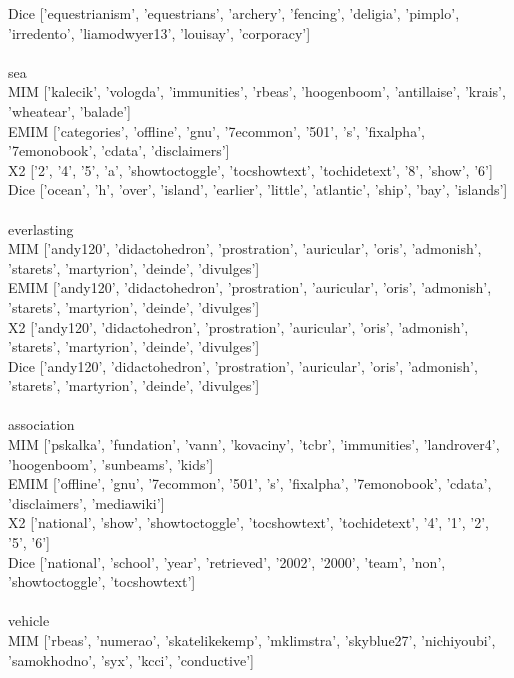 \documentclass[10pt,letterpaper,bibliography=totoc]{scrartcl}
\begin{document}
  Dice ['equestrianism', 'equestrians', 'archery', 'fencing', 'deligia', 'pimplo', 'irredento', 'liamodwyer13', 'louisay', 'corporacy']\\\\
sea\\
  MIM  ['kalecik', 'vologda', 'immunities', 'rbeas', 'hoogenboom', 'antillaise', 'krais', 'wheatear', 'balade']\\
  EMIM ['categories', 'offline', 'gnu', '7ecommon', '501', 's', 'fixalpha', '7emonobook', 'cdata', 'disclaimers']\\
  X2   ['2', '4', '5', 'a', 'showtoctoggle', 'tocshowtext', 'tochidetext', '8', 'show', '6']\\
  Dice ['ocean', 'h', 'over', 'island', 'earlier', 'little', 'atlantic', 'ship', 'bay', 'islands']\\\\
everlasting\\
  MIM  ['andy120', 'didactohedron', 'prostration', 'auricular', 'oris', 'admonish', 'starets', 'martyrion', 'deinde', 'divulges']\\
  EMIM ['andy120', 'didactohedron', 'prostration', 'auricular', 'oris', 'admonish', 'starets', 'martyrion', 'deinde', 'divulges']\\
  X2   ['andy120', 'didactohedron', 'prostration', 'auricular', 'oris', 'admonish', 'starets', 'martyrion', 'deinde', 'divulges']\\
  Dice ['andy120', 'didactohedron', 'prostration', 'auricular', 'oris', 'admonish', 'starets', 'martyrion', 'deinde', 'divulges']\\\\
association\\
  MIM  ['pskalka', 'fundation', 'vann', 'kovaciny', 'tcbr', 'immunities', 'landrover4', 'hoogenboom', 'sunbeams', 'kids']\\
  EMIM ['offline', 'gnu', '7ecommon', '501', 's', 'fixalpha', '7emonobook', 'cdata', 'disclaimers', 'mediawiki']\\
  X2   ['national', 'show', 'showtoctoggle', 'tocshowtext', 'tochidetext', '4', '1', '2', '5', '6']\\
  Dice ['national', 'school', 'year', 'retrieved', '2002', '2000', 'team', 'non', 'showtoctoggle', 'tocshowtext']\\\\
vehicle\\
  MIM  ['rbeas', 'numerao', 'skatelikekemp', 'mklimstra', 'skyblue27', 'nichiyoubi', 'samokhodno', 'syx', 'kcci', 'conductive']\\
\end{document}

